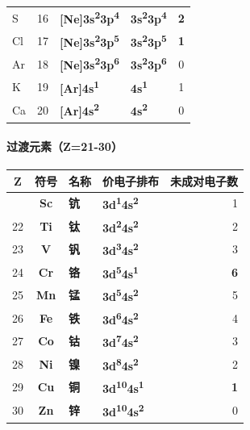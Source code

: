 \documentclass[a4paper,11pt]{ctexart}
\newcounter{none}
\begin{document}
{\begin{longtable}[]{@{}lcllc@{}}
S & 16 & \textbf{{[}Ne{]}3s\textsuperscript{2}3p\textsuperscript{4}} & \textbf{3s\textsuperscript{2}3p\textsuperscript{4}} & \textbf{2} \\
Cl & 17 & \textbf{{[}Ne{]}3s\textsuperscript{2}3p\textsuperscript{5}} & \textbf{3s\textsuperscript{2}3p\textsuperscript{5}} & \textbf{1} \\
Ar & 18 & \textbf{{[}Ne{]}3s\textsuperscript{2}3p\textsuperscript{6}} & \textbf{3s\textsuperscript{2}3p\textsuperscript{6}} & 0 \\
K & 19 & \textbf{{[}Ar{]}4s\textsuperscript{1}} & \textbf{4s\textsuperscript{1}} & 1 \\
Ca & 20 & \textbf{{[}Ar{]}4s\textsuperscript{2}} & \textbf{4s\textsuperscript{2}} & 0 \\
\end{longtable}
}

\paragraph{过渡元素（Z=21-30）}\label{ux8fc7ux6e21ux5143ux7d20z21-30}

{\def\LTcaptype{none} %
\begin{longtable}[]{@{}ccllr@{}}
\toprule\noalign{}
Z & 符号 & 名称 & 价电子排布 & 未成对电子数 \\
\midrule\noalign{}
\endhead
\bottomrule\noalign{}
\endlastfoot
21 & \textbf{Sc} & \textbf{钪} & \textbf{3d\textsuperscript{1}4s\textsuperscript{2}} & 1 \\
22 & \textbf{Ti} & \textbf{钛} & \textbf{3d\textsuperscript{2}4s\textsuperscript{2}} & 2 \\
23 & \textbf{V} & \textbf{钒} & \textbf{3d\textsuperscript{3}4s\textsuperscript{2}} & 3 \\
24 & \textbf{Cr} & \textbf{铬} & \textbf{3d\textsuperscript{5}4s\textsuperscript{1}} & \textbf{6} \\
25 & \textbf{Mn} & \textbf{锰} & \textbf{3d\textsuperscript{5}4s\textsuperscript{2}} & 5 \\
26 & \textbf{Fe} & \textbf{铁} & \textbf{3d\textsuperscript{6}4s\textsuperscript{2}} & 4 \\
27 & \textbf{Co} & \textbf{钴} & \textbf{3d\textsuperscript{7}4s\textsuperscript{2}} & 3 \\
28 & \textbf{Ni} & \textbf{镍} & \textbf{3d\textsuperscript{8}4s\textsuperscript{2}} & 2 \\
29 & \textbf{Cu} & \textbf{铜} & \textbf{3d\textsuperscript{10}4s\textsuperscript{1}} & \textbf{1} \\
30 & \textbf{Zn} & \textbf{锌} & \textbf{3d\textsuperscript{10}4s\textsuperscript{2}} & 0 \\
\end{longtable}
}
\end{document}
